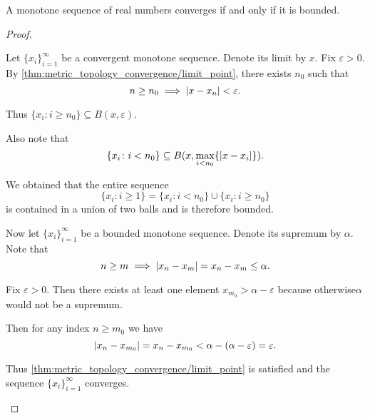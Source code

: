 \begin{proposition}\label{thm:real_monotone_sequence_converges_iff_bounded}
  A monotone sequence of real numbers converges if and only if it is bounded.
\end{proposition}
\begin{proof}
  \begin{description}
    \Implies Let \( \{ x_i \}_{i=1}^\infty \) be a convergent monotone sequence. Denote its limit by \( x \). Fix \( \varepsilon > 0 \). By \cref{thm:metric_topology_convergence/limit_point}, there exists \( n_0 \) such that
    \begin{equation*}
      n \geq n_0 \implies \left\vert x - x_n \right\vert < \varepsilon.
    \end{equation*}

    Thus \( \{ x_i \colon i \geq n_0 \} \subseteq B(x, \varepsilon) \).

    Also note that
    \begin{equation*}
      \{ x_i \colon i < n_0 \} \subseteq B(x, \max_{i < n_0} \{ \left\vert x - x_i \right\vert \}).
    \end{equation*}

    We obtained that the entire sequence
    \begin{equation*}
      \{ x_i \colon i \geq 1 \} = \{ x_i \colon i < n_0 \} \cup \{ x_i \colon i \geq n_0 \}
    \end{equation*}
    is contained in a union of two balls and is therefore bounded.

    \ImpliedBy Now let \( \{ x_i \}_{i=1}^\infty \) be a bounded monotone sequence. Denote its supremum by \( \alpha \). Note that
    \begin{equation*}
      n \geq m \implies \left\vert x_n - x_m \right\vert = x_n - x_m \leq \alpha.
    \end{equation*}

    Fix \( \varepsilon > 0 \). Then there exists at least one element \( x_{m_0} > \alpha - \varepsilon \) because otherwise\LEM \( \alpha \) would not be a supremum.

    Then for any index \( n \geq m_0 \) we have
    \begin{equation*}
      \left\vert x_n - x_{m_0} \right\vert = x_n - x_{m_0} < \alpha - (\alpha - \varepsilon) = \varepsilon.
    \end{equation*}

    Thus \cref{thm:metric_topology_convergence/limit_point} is satisfied and the sequence \( \{ x_i \}_{i=1}^\infty \) converges.
  \end{description}
\end{proof}
